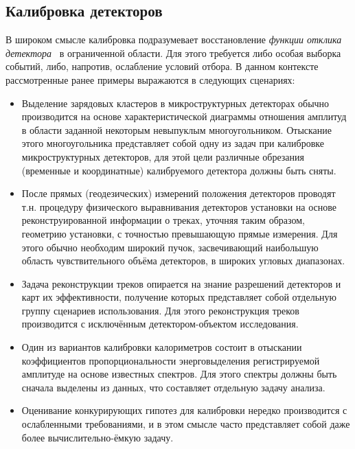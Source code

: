 \subsection{Калибровка детекторов}

В широком смысле калибровка подразумевает восстановление \emph{функции отклика детектора}~\cite{exp-methods-Abramov1977} в ограниченной области. Для этого требуется либо особая выборка событий, либо, напротив, ослабление условий отбора.
В данном контексте рассмотренные ранее примеры выражаются в следующих
сценариях:

\begin{itemize}
    \item Выделение зарядовых кластеров в микроструктурных детекторах
    обычно производится на основе характеристической диаграммы
    отношения амплитуд в области заданной
    некоторым невыпуклым многоугольником. Отыскание этого
    многоугольника представляет собой одну из задач при калибровке
    микроструктурных детекторов, для этой цели различные обрезания
    (временные и координатные) калибруемого детектора должны быть сняты.
    \item После прямых (геодезических) измерений положения детекторов проводят
    т.н. процедуру физического выравнивания
    детекторов установки на основе реконструированной информации о
    треках, уточняя таким образом, геометрию установки, с точностью
    превышающую прямые измерения. Для этого обычно необходим
    широкий пучок, засвечивающий наибольшую область
    чувствительного объёма детекторов, в широких угловых диапазонах.
    \item Задача реконструкции треков опирается на знание разрешений
    детекторов и карт их эффективности, получение которых представляет
    собой отдельную группу сценариев использования. Для этого реконструкция
    треков производится с исключённым детектором-объектом исследования.
    \item Один из вариантов калибровки калориметров состоит в отыскании
    коэффициентов пропорциональности энерговыделения регистрируемой амплитуде
    на основе известных спектров. Для этого спектры должны быть сначала
    выделены из данных, что составляет отдельную задачу анализа.
    \item Оценивание конкурирующих гипотез для калибровки нередко
    производится с ослабленными требованиями, и в этом смысле часто
    представляет собой даже более вычислительно-ёмкую задачу.
\end{itemize}

